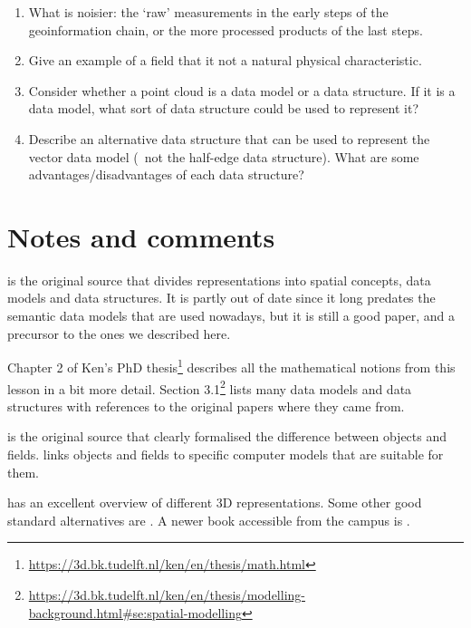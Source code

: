 \begin{enumerate}
	\item What is noisier: the `raw' measurements in the early steps of the geoinformation chain, or the more processed products of the last steps.
	\item Give an example of a field that it not a natural physical characteristic.
	\item Consider whether a point cloud is a data model or a data structure. If it is a data model, what sort of data structure could be used to represent it?
	\item Describe an alternative data structure that can be used to represent the vector data model (\ie\ not the half-edge data structure). What are some advantages/disadvantages of each data structure?
\end{enumerate}



%
\section{Notes and comments}

\citet{Frank92} is the original source that divides representations into spatial concepts, data models and data structures.
It is partly out of date since it long predates the semantic data models that are used nowadays, but it is still a good paper, and a precursor to the ones we described here.

Chapter 2 of Ken's PhD thesis\footnote{\url{https://3d.bk.tudelft.nl/ken/en/thesis/math.html}} describes all the mathematical notions from this lesson in a bit more detail.
Section 3.1\footnote{\url{https://3d.bk.tudelft.nl/ken/en/thesis/modelling-background.html\#se:spatial-modelling}} lists many data models and data structures with references to the original papers where they came from.

\citet{Couclelis92} is the original source that clearly formalised the difference between objects and fields.
\citet{Goodchild92} links objects and fields to specific computer models that are suitable for them.

\citet{Mantyla88} has an excellent overview of different 3D representations.
Some other good standard alternatives are \citet{Requicha80,Hoffmann92,Foley95}.
A newer book accessible from the campus is \citet{Salomon11}.

